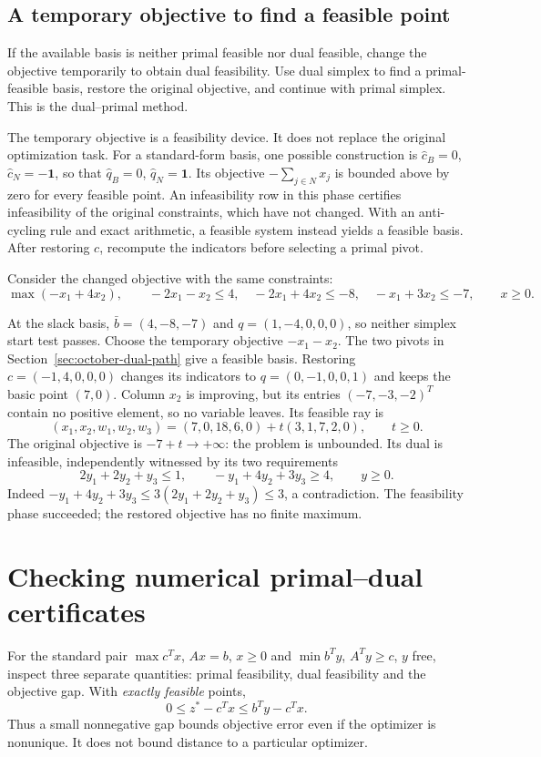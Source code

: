 \documentclass[11pt,a4paper]{article}
\begin{document}
\subsection{A temporary objective to find a feasible point}\label{sec:dual-primal-start}
\begin{lecturecore}
  If the available basis is neither primal feasible nor dual feasible, change
  the objective temporarily to obtain dual feasibility. Use dual simplex to
  find a primal-feasible basis, restore the original objective, and continue
  with primal simplex. This is the dual--primal method.
\end{lecturecore}
The temporary objective is a feasibility device. It does not replace the
original optimization task. For a standard-form basis, one possible construction
is $\widehat c_B=0$, $\widehat c_N=-\mathbf1$, so that
$\widehat q_B=0$, $\widehat q_N=\mathbf1$. Its objective
$-\sum_{j\in N}x_j$ is bounded above by zero for every feasible point.
An infeasibility row in this phase certifies infeasibility of the original
constraints, which have not changed. With an anti-cycling rule and exact
arithmetic, a feasible system instead yields a feasible basis. After restoring
$c$, recompute the indicators before selecting a primal pivot.

\begin{lecturecore}
  Consider the changed objective with the same constraints:
  \[
    \max(-x_1+4x_2),\qquad
    -2x_1-x_2\leq4,\quad -2x_1+4x_2\leq-8,\quad
    -x_1+3x_2\leq-7,\qquad x\geq0.
  \]
\end{lecturecore}
At the slack basis, $\bar b=(4,-8,-7)$ and $q=(1,-4,0,0,0)$, so neither
simplex start test passes. Choose the temporary objective $-x_1-x_2$.
The two pivots in Section~\ref{sec:october-dual-path} give a feasible basis.
Restoring $c=(-1,4,0,0,0)$ changes its indicators to
$q=(0,-1,0,0,1)$ and keeps the basic point $(7,0)$.
Column $x_2$ is improving, but its entries $(-7,-3,-2)^T$ contain no
positive element, so no variable leaves. Its feasible ray is
\[
  (x_1,x_2,w_1,w_2,w_3)
  =(7,0,18,6,0)+t(3,1,7,2,0),\qquad t\geq0.
\]
The original objective is $-7+t\to+\infty$: the problem is unbounded.
Its dual is infeasible, independently witnessed by its two requirements
\[
  2y_1+2y_2+y_3\leq1,\qquad -y_1+4y_2+3y_3\geq4,\qquad y\geq0.
\]
Indeed $-y_1+4y_2+3y_3\leq3(2y_1+2y_2+y_3)\leq3$, a contradiction.
The feasibility phase succeeded; the restored objective has no finite maximum.

\section{Checking numerical primal--dual certificates}\label{sec:numerical-certificate}
For the standard pair $\max c^Tx$, $Ax=b$, $x\geq0$ and
$\min b^Ty$, $A^Ty\geq c$, $y$ free, inspect three separate quantities:
primal feasibility, dual feasibility and the objective gap.
With \emph{exactly feasible} points,
\[
  0\leq z^*-c^Tx\leq b^Ty-c^Tx.
\]
Thus a small nonnegative gap bounds objective error even if the optimizer is
nonunique. It does not bound distance to a particular optimizer.
\end{document}
